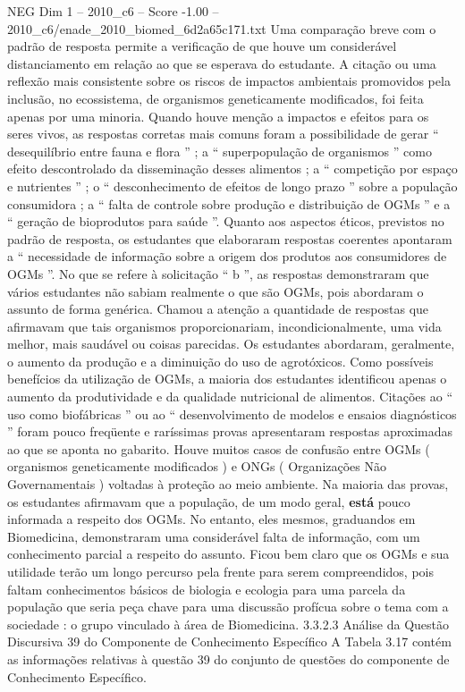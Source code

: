 \begin{textsample}{NEG Dim 1 – 2010\_c6 – Score -1.00 – 2010\_c6/enade\_2010\_biomed\_6d2a65c171.txt}
Uma comparação breve com o padrão de resposta permite a verificação de que houve um considerável distanciamento em relação ao que se esperava do estudante.
A citação ou uma reflexão mais consistente sobre os riscos de impactos ambientais promovidos pela inclusão, no ecossistema, de organismos geneticamente modificados, foi feita apenas por uma minoria.
Quando houve menção a impactos e efeitos para os seres vivos, as respostas corretas mais comuns foram a possibilidade de gerar “ desequilíbrio entre fauna e flora ” ; a “ superpopulação de organismos ” como efeito descontrolado da disseminação desses alimentos ; a “ competição por espaço e nutrientes ” ; o “ desconhecimento de efeitos de longo prazo ” sobre a população consumidora ; a “ falta de controle sobre produção e distribuição de OGMs ” e a “ geração de bioprodutos para saúde ”.
Quanto aos aspectos éticos, previstos no padrão de resposta, os estudantes que elaboraram respostas coerentes apontaram a “ necessidade de informação sobre a origem dos produtos aos consumidores de OGMs ”.
No que se refere à solicitação “ b ”, as respostas demonstraram que vários estudantes não sabiam realmente o que são OGMs, pois abordaram o assunto de forma genérica.
Chamou a atenção a quantidade de respostas que afirmavam que tais organismos proporcionariam, incondicionalmente, uma vida melhor, mais saudável ou coisas parecidas.
Os estudantes abordaram, geralmente, o aumento da produção e a diminuição do uso de agrotóxicos.
Como possíveis benefícios da utilização de OGMs, a maioria dos estudantes identificou apenas o aumento da produtividade e da qualidade nutricional de alimentos.
Citações ao “ uso como biofábricas ” ou ao “ desenvolvimento de modelos e ensaios diagnósticos ” foram pouco freqüente e raríssimas provas apresentaram respostas aproximadas ao que se aponta no gabarito.
Houve muitos casos de confusão entre OGMs ( organismos geneticamente modificados ) e ONGs ( Organizações Não Governamentais ) voltadas à proteção ao meio ambiente.
Na maioria das provas, os estudantes afirmavam que a população, de um modo geral, \textbf{está} pouco informada a respeito dos OGMs.
No entanto, eles mesmos, graduandos em Biomedicina, demonstraram uma considerável falta de informação, com um conhecimento parcial a respeito do assunto.
Ficou bem claro que os OGMs e sua utilidade terão um longo percurso pela frente para serem compreendidos, pois faltam conhecimentos básicos de biologia e ecologia para uma parcela da população que seria peça chave para uma discussão profícua sobre o tema com a sociedade : o grupo vinculado à área de Biomedicina. 3.3.2.3 Análise da Questão Discursiva 39 do Componente de Conhecimento Específico A Tabela 3.17 contém as informações relativas à questão 39 do conjunto de questões do componente de Conhecimento Específico.

\end{textsample}
